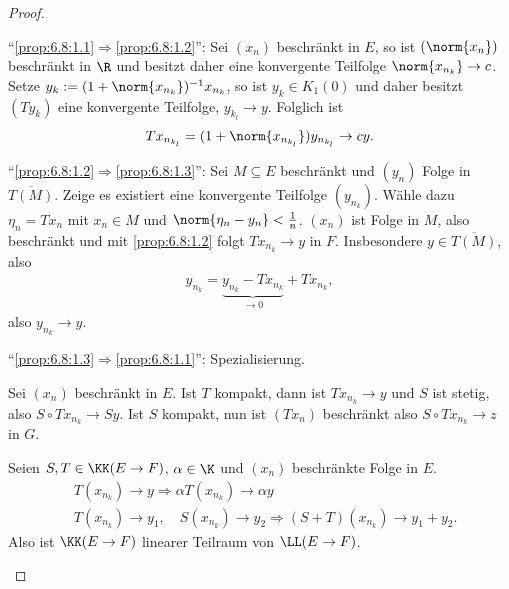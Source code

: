 \begin{proof}
\begin{propenum}
  \item ``\ref{prop:6.8:1.1}$\Rightarrow$\ref{prop:6.8:1.2}'': Sei $(x_n)$
  beschränkt in $E$, so ist $(\norm{x_n})$ beschränkt in $\R$ und besitzt daher
  eine konvergente Teilfolge $\norm{x_{n_k}}\to c$.
  Setze $y_k := (1+\norm{x_{n_k}})^{-1}x_{n_k}$, so ist $y_k\in K_1(0)$ und
  daher besitzt $(Ty_k)$ eine konvergente Teilfolge, $y_{k_l}\to y$. Folglich
  ist
\begin{align*}
Tx_{n_{k_l}} = (1+\norm{x_{n_{k_l}}})y_{n_{k_l}}\to cy.
\end{align*}
  
%   
``\ref{prop:6.8:1.2}$\Rightarrow$\ref{prop:6.8:1.3}'':
Sei $M\subseteq E$ beschränkt und $(y_n)$ Folge in $\overline{T(M)}$. Zeige es
existiert eine konvergente Teilfolge $(y_{n_k})$. Wähle dazu $\eta_n=Tx_n$ mit
$x_n\in M$ und $\norm{\eta_n-y_n}<\frac{1}{n}$. $(x_n)$ ist Folge in $M$, also
beschränkt und mit \ref{prop:6.8:1.2} folgt $Tx_{n_k}\to y$ in $F$.
Insbesondere $y\in \overline{T(M)}$, also
\begin{align*}
y_{n_k} = \underbrace{y_{n_k} - Tx_{n_k}}_{\to 0} + Tx_{n_k},
\end{align*}
also $y_{n_k}\to y$.

``\ref{prop:6.8:1.3}$\Rightarrow$\ref{prop:6.8:1.1}'': Spezialisierung.
\item Sei $(x_n)$ beschränkt in $E$. Ist $T$ kompakt, dann ist $Tx_{n_k}\to y$
und $S$ ist stetig, also $S\circ Tx_{n_k}\to Sy$. Ist $S$ kompakt, nun ist
$(Tx_{n})$ beschränkt also $S\circ Tx_{n_k}\to z$ in $G$.
\item Seien $S,T\in\KK(E\to F)$, $\alpha\in \K$ und $(x_n)$ beschränkte Folge
in $E$.
\begin{align*}
 &T(x_{n_k}) \to y\Rightarrow \alpha T(x_{n_k}) \to \alpha y\\
 &T(x_{n_k})\to y_1,\quad S(x_{n_k})\to y_2\Rightarrow
 (S+T)(x_{n_k}) \to y_1+y_2.
\end{align*}
Also ist $\KK(E\to F)$ linearer Teilraum von $\LL(E\to F)$.


\end{propenum}
\end{proof}
